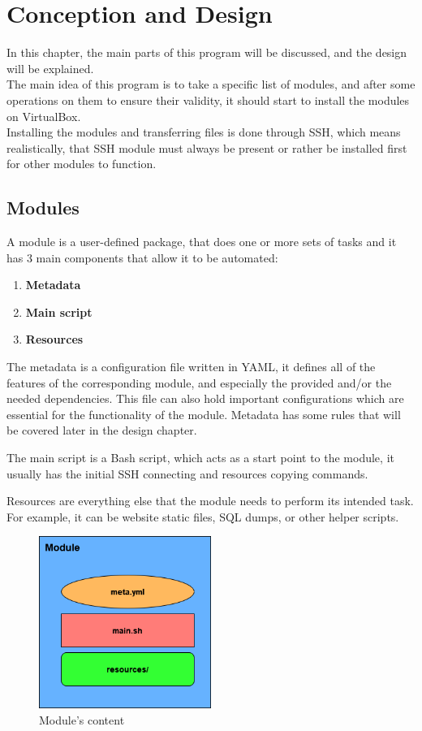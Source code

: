 \chapter{Conception and Design}
In this chapter, the main parts of this program will be discussed, and the design will be explained.\\
The main idea of this program is to take a specific list of modules, and after some operations on them to ensure their validity, it should start to install the modules on VirtualBox\cite{virtualbox}.\\
Installing the modules and transferring files is done through SSH, which means realistically, that SSH module must always be present or rather be installed first for other modules to function.

\section{Modules}
A module is a user-defined package, that does one or more sets of tasks and it has 3 main components that allow it to be automated:
\begin{enumerate}
    \item \textbf{Metadata}
    \item \textbf{Main script}
    \item \textbf{Resources}
\end{enumerate}
The metadata is a configuration file written in YAML, it defines all of the features of the corresponding module, and especially the provided and/or the needed dependencies. This file can also hold important configurations which are essential for the functionality of the module.
Metadata has some rules that will be covered later in the design chapter.

The main script is a Bash script, which acts as a start point to the module, it usually has the initial SSH connecting and resources copying commands.

Resources are everything else that the module needs to perform its intended task. For example, it can be website static files, SQL dumps, or other helper scripts.
\\
\begin{figure}[!ht]
\centering
\includegraphics[width=0.5\textwidth]{resources/figures/module.png}
\caption{Module's content}
\end{figure}

